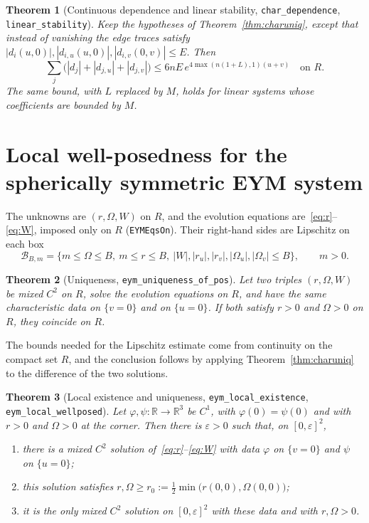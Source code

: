 \documentclass[pdflatex,sn-mathphys-num]{sn-jnl}%
\theoremstyle{thmstyleone}%
\newtheorem{theorem}{Theorem}%
\theoremstyle{thmstyletwo}%
\theoremstyle{thmstylethree}%
\newcommand{\lean}[1]{\texttt{#1}}
\newcommand{\R}{\mathbb{R}}
\begin{document}
\begin{theorem}[Continuous dependence and linear stability, \lean{char\_dependence}, \lean{linear\_stability}]\label{thm:dependence}
Keep the hypotheses of Theorem~\ref{thm:charuniq}, except that instead of vanishing the edge traces satisfy $|d_i(u,0)|,|d_{i,u}(u,0)|,|d_{i,v}(0,v)|\le E$. Then
\[
\sum_j\bigl(|d_j|+|d_{j,u}|+|d_{j,v}|\bigr)\le6nE\,e^{4\max(n(1+L),1)(u+v)}\quad\text{on }R.
\]
The same bound, with $L$ replaced by $M$, holds for linear systems whose coefficients are bounded by $M$.
\end{theorem}

\section{Local well-posedness for the spherically symmetric EYM system}\label{sec:eym}

The unknowns are $(r,\Omega,W)$ on $R$, and the evolution equations are~\eqref{eq:r}--\eqref{eq:W}, imposed only on $R$ (\lean{EYMEqsOn}). Their right-hand sides are Lipschitz on each box
\[
\mathcal B_{B,m}=\bigl\{m\le\Omega\le B,\ m\le r\le B,\ |W|,|r_u|,|r_v|,|\Omega_u|,|\Omega_v|\le B\bigr\},\qquad m>0.
\]

\begin{theorem}[Uniqueness, \lean{eym\_uniqueness\_of\_pos}]\label{thm:eymuniq}
Let two triples $(r,\Omega,W)$ be mixed $C^2$ on $R$, solve the evolution equations on $R$, and have the same characteristic data on $\{v=0\}$ and on $\{u=0\}$. If both satisfy $r>0$ and $\Omega>0$ on $R$, they coincide on $R$.
\end{theorem}

The bounds needed for the Lipschitz estimate come from continuity on the compact set $R$, and the conclusion follows by applying Theorem~\ref{thm:charuniq} to the difference of the two solutions.

\begin{theorem}[Local existence and uniqueness, \lean{eym\_local\_existence}, \lean{eym\_local\_wellposed}]\label{thm:lwp}
Let $\varphi,\psi:\R\to\R^3$ be $C^1$, with $\varphi(0)=\psi(0)$ and with $r>0$ and $\Omega>0$ at the corner. Then there is $\varepsilon>0$ such that, on $[0,\varepsilon]^2$,
\begin{enumerate}
\item there is a mixed $C^2$ solution of~\eqref{eq:r}--\eqref{eq:W} with data $\varphi$ on $\{v=0\}$ and $\psi$ on $\{u=0\}$;
\item this solution satisfies $r,\Omega\ge r_0:=\tfrac12\min\bigl(r(0,0),\Omega(0,0)\bigr)$;
\item it is the only mixed $C^2$ solution on $[0,\varepsilon]^2$ with these data and with $r,\Omega>0$.
\end{enumerate}
\end{theorem}
\end{document}
